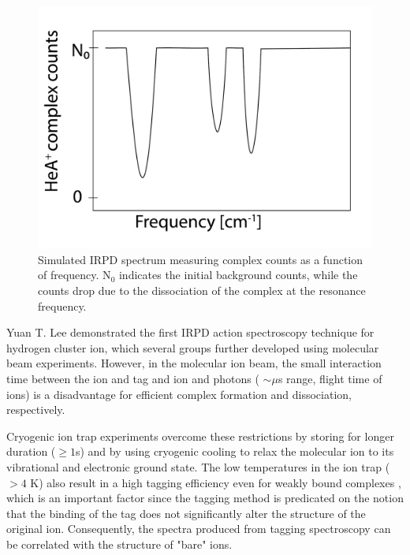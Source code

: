 \begin{figure}[!htb]
    \centering
    \includegraphics[scale=0.5]{figures/intro/IRPD_spectrum.png}
    \caption{Simulated IRPD spectrum measuring complex counts as a function of frequency. N$_0$ indicates the initial background counts, while the counts drop due to the dissociation of the complex at the resonance frequency.}
    \label{fig:IRPD_spectrum}
\end{figure}

Yuan T. Lee demonstrated the first  IRPD action spectroscopy technique  \cite{okumura_vibrational_1985} for hydrogen cluster ion, which several groups further developed \cite{bieske_spectroscopic_1993, duncan_infrared_2003, lisy_infrared_2006} using molecular beam experiments. However, in the molecular ion beam, the small interaction time between the ion and tag and ion and photons ( $\sim \mu$s range, flight time of ions) is a disadvantage for efficient complex formation and dissociation, respectively.

Cryogenic ion trap experiments overcome these restrictions \cite{asmis_mass-selected_2002, kohguchi_high-resolution_2018, jusko_felion_2019, topfer_spectroscopic_2020, dahlmann_predissociation_2022} by storing for longer duration ($\geq 1$s) and by using cryogenic cooling to relax the molecular ion to its vibrational and electronic ground state. The low temperatures in the ion trap ($> 4$ K) also result in a high tagging efficiency even for weakly bound complexes \cite{roithova_helium_2016, gerlich_infrared_2018}, which is an important factor since the tagging method is predicated on the notion that the binding of the tag does not significantly alter the structure of the original ion. Consequently, the spectra produced from tagging spectroscopy can be correlated with the structure of "bare" ions.\\

